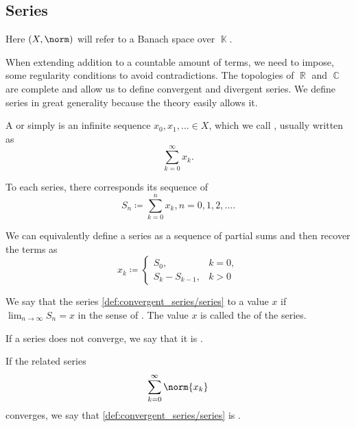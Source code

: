 \subsection{Series}\label{subsec:series}

Here \( (X, \norm) \) will refer to a Banach space over \( \BbbK \).

\begin{definition}\label{def:convergent_series}
  When extending addition to a countable amount of terms, we need to impose, some regularity conditions to avoid contradictions. The topologies of \( \BbbR \) and \( \BbbC \) are complete and allow us to define convergent and divergent series. We define series in great generality because the theory easily allows it.

  A  or simply  is an infinite sequence \( x_0, x_1, \ldots \in X \), which we call , usually written as
  \begin{equation}\label{def:convergent_series/series}
    \sum_{k=0}^\infty x_k.
  \end{equation}

  To each series, there corresponds its sequence of 
  \begin{equation*}
    S_n \coloneqq \sum_{k=0}^n x_k, n = 0, 1, 2, \ldots.
  \end{equation*}

  We can equivalently define a series as a sequence of partial sums and then recover the terms as
  \begin{equation*}
    x_k \coloneqq \begin{cases}
      S_0,           & k = 0, \\
      S_k - S_{k-1}, & k > 0
    \end{cases}
  \end{equation*}

  We say that the series \eqref{def:convergent_series/series}  to a value \( x \) if \( \lim_{n \to \infty} S_n = x \) in the sense of . The value \( x \) is called the  of the series.

  If a series does not converge, we say that it is .

  If the related series
  \begin{equation}\label{def:convergent_series/absolute_series}
    \sum_{k=0}^\infty \norm{x_k}
  \end{equation}
  converges, we say that \eqref{def:convergent_series/series} is .
\end{definition}

